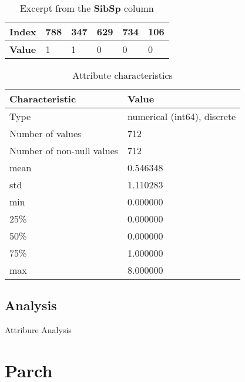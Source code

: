\begin{table}[!ht]
    \centering
    \caption{Excerpt from the \textbf{SibSp} column}
    \begin{tabular}{|l|l|l|l|l|l|}
        \hline
        \textbf{Index} & 788 & 347 & 629 & 734 & 106 \\ \hline
        \textbf{Value} & 1   & 1   & 0   & 0   & 0   \\ \hline
    \end{tabular}
    \label{table:sibsp_head}
\end{table}

\begin{table}[!ht]
    \centering
    \caption{Attribute characteristics}
    \begin{tabular}{|l|l|}
        \hline
        \textbf{Characteristic}   & \textbf{Value}              \\ \hline
        Type                      & numerical (int64), discrete \\ \hline
        Number of values          & 712                         \\ \hline
        Number of non-null values & 712                         \\ \hline
        mean                      & 0.546348                    \\ \hline
        std                       & 1.110283                    \\ \hline
        min                       & 0.000000                    \\ \hline
        25\%                      & 0.000000                    \\ \hline
        50\%                      & 0.000000                    \\ \hline
        75\%                      & 1.000000                    \\ \hline
        max                       & 8.000000                    \\ \hline
    \end{tabular}
    \label{table:age_characteristics}
\end{table}

\subsection{Analysis}
Attribure Analysis


\section{Parch} \label{section:Parch}
